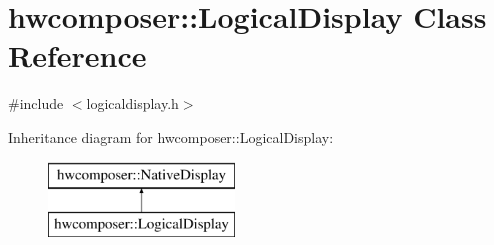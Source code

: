 \hypertarget{classhwcomposer_1_1LogicalDisplay}{}\section{hwcomposer\+:\+:Logical\+Display Class Reference}
\label{classhwcomposer_1_1LogicalDisplay}


{\ttfamily \#include $<$logicaldisplay.\+h$>$}

Inheritance diagram for hwcomposer\+:\+:Logical\+Display\+:\begin{figure}[H]
\begin{center}
\leavevmode
\includegraphics[height=2.000000cm]{classhwcomposer_1_1LogicalDisplay}
\end{center}
\end{figure}
